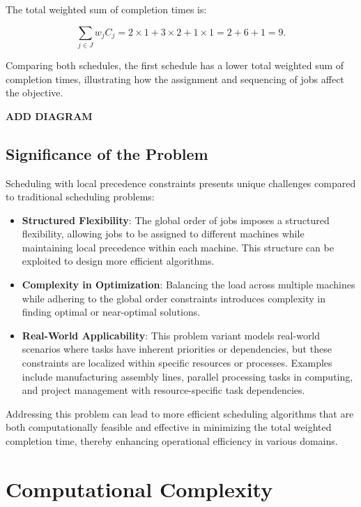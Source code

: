 \begin{example}
    The total weighted sum of completion times is:

    \[
        \sum_{j \in J} w_j C_j = 2 \times 1 + 3 \times 2 + 1 \times 1 = 2 + 6 + 1 = 9.
    \]

    Comparing both schedules, the first schedule has a lower total weighted sum of completion times, illustrating how the assignment and sequencing of jobs affect the objective.

    \textbf{ADD DIAGRAM}

\end{example}

\subsection*{Significance of the Problem}

Scheduling with local precedence constraints presents unique challenges compared to traditional scheduling problems:

\begin{itemize}
    \item \textbf{Structured Flexibility}: The global order of jobs imposes a structured flexibility, allowing jobs to be assigned to different machines while maintaining local precedence within each machine. This structure can be exploited to design more efficient algorithms.

    \item \textbf{Complexity in Optimization}: Balancing the load across multiple machines while adhering to the global order constraints introduces complexity in finding optimal or near-optimal solutions.

    \item \textbf{Real-World Applicability}: This problem variant models real-world scenarios where tasks have inherent priorities or dependencies, but these constraints are localized within specific resources or processes. Examples include manufacturing assembly lines, parallel processing tasks in computing, and project management with resource-specific task dependencies.
\end{itemize}

Addressing this problem can lead to more efficient scheduling algorithms that are both computationally feasible and effective in minimizing the total weighted completion time, thereby enhancing operational efficiency in various domains.


\section{Computational Complexity}

